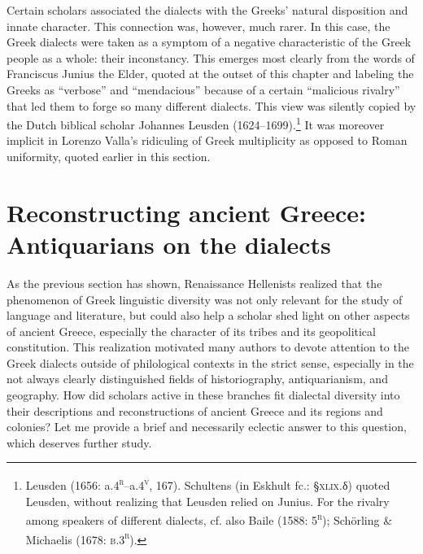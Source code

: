 Certain scholars associated the dialects with the Greeks’ natural disposition and innate character. This connection was, however, much rarer. In this case, the Greek dialects were taken as a symptom of a negative characteristic of the Greek people as a whole: their inconstancy. This emerges most clearly from the words of Franciscus Junius the Elder, quoted at the outset of this chapter and labeling the Greeks as “verbose” and “mendacious” because of a certain “malicious rivalry” that led them to forge so many different dialects. This view was silently copied by the Dutch biblical scholar Johannes Leusden (1624–1699).\footnote{Leusden (1656: a.4\textsc{\textsuperscript{r}}\textsc{–}a.4\textsc{\textsuperscript{v}}, 167). Schultens (in Eskhult fc.: §\textsc{xlix.}δ) quoted Leusden, without realizing that Leusden relied on Junius. For the rivalry among speakers of different dialects, cf. also Baile (1588: 5\textsc{\textsuperscript{r}}); Schörling \& Michaelis (1678: \textsc{b.3}\textsc{\textsuperscript{r}}).} It was moreover implicit in Lorenzo Valla’s ridiculing of Greek multiplicity as opposed to Roman uniformity, quoted earlier in this section.

\section{Reconstructing ancient Greece: Antiquarians on the dialects}

As the previous section has shown, Renaissance Hellenists realized that the phenomenon of Greek linguistic diversity was not only relevant for the study of language and literature, but could also help a scholar shed light on other aspects of ancient Greece, especially the character of its tribes and its geopolitical constitution. This realization motivated many authors to devote attention to the Greek dialects outside of philological contexts in the strict sense, especially in the not always clearly distinguished fields of historiography, antiquarianism, and geography. How did scholars active in these branches fit dialectal diversity into their descriptions and reconstructions of ancient Greece and its regions and colonies? Let me provide a brief and necessarily eclectic answer to this question, which deserves further study.

